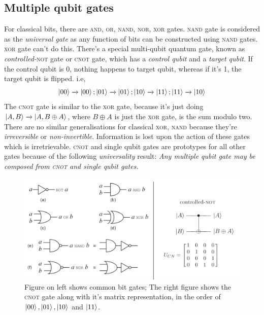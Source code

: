 \subsection{Multiple qubit gates}
For classical bits, there are \textsc{and, or, nand, nor, xor} gates. \textsc{nand} gate is considered as the \textit{universal gate} as any function of bits can be constructed using \textsc{nand} gates. \textsc{xor} gate can't do this. There's a special multi-qubit quantum gate, known as \textit{controlled-}\textsc{not} gate or \textsc{cnot} gate, which has a \textit{control qubit} and a \textit{target qubit}. If the control qubit is 0, nothing happens to target qubit, whereas if it's 1, the target qubit is flipped. i.e,
\begin{equation}
    \ket{00} \xrightarrow{} \ket{00}; \ket{01} \xrightarrow{} \ket{01};
    \ket{10} \xrightarrow{} \ket{11}; \ket{11} \xrightarrow{} \ket{10}
\end{equation}
The \textsc{cnot} gate is similar to the \textsc{xor} gate, because it's just doing $\ket{A, B} \xrightarrow[]{} \ket{A, B\oplus A}$, where $B\oplus A$ is just the \textsc{xor} gate, is the sum modulo two. There are no similar generalisations for classical \textsc{xor, nand} because they're \textit{irreversible} or \textit{non-invertible}. Information is lost upon the action of these gates which is irretrievable. \textsc{cnot} and single qubit gates are prototypes for all other gates because of the following \textit{universality} result: \textit{Any multiple qubit gate may be composed from \textsc{cnot} and single qubit gates.} 
\begin{figure}[H]
    \centering
    \includegraphics[width=\textwidth]{images/multi_gates.png}
    \caption{Figure on left shows common bit gates; The right figure shows the \textsc{cnot} gate along with it's matrix representation, in the order of $\ket{00}, \ket{01}, \ket{10}$ and $\ket{11}$.}
    \label{fig:multi_gates}
\end{figure}

